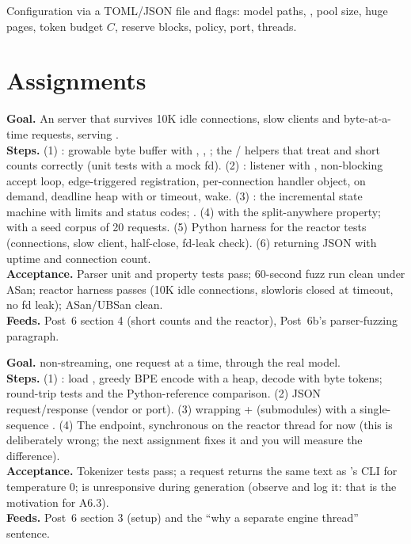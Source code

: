 Configuration via a TOML/JSON file and flags: model paths, , pool size, huge pages, token budget $C$, reserve blocks, policy, port, threads.

\section{Assignments}

\textbf{Goal.} An  server that survives 10K idle connections, slow clients and byte-at-a-time requests, serving .\\
\textbf{Steps.} (1) : growable byte buffer with , , ; the / helpers that treat  and short counts correctly (unit tests with a mock fd). (2) : listener with , non-blocking accept loop, edge-triggered registration, per-connection handler object,  on demand, deadline heap with  or  timeout,  wake. (3) : the incremental state machine with limits and status codes; . (4)  with the split-anywhere property;  with a seed corpus of 20 requests. (5) Python harness for the reactor tests (connections, slow client, half-close, fd-leak check). (6)  returning JSON with uptime and connection count.\\
\textbf{Acceptance.} Parser unit and property tests pass; 60-second fuzz run clean under ASan; reactor harness passes (10K idle connections, slowloris closed at timeout, no fd leak); ASan/UBSan clean.\\
\textbf{Feeds.} Post~6 section 4 (short counts and the reactor), Post~6b's parser-fuzzing paragraph.

\textbf{Goal.}  non-streaming, one request at a time, through the real model.\\
\textbf{Steps.} (1) : load , greedy BPE encode with a heap, decode with byte tokens; round-trip tests and the Python-reference comparison. (2) JSON request/response (vendor or port). (3)  wrapping  +  (submodules) with a single-sequence . (4) The endpoint, synchronous on the reactor thread for now (this is deliberately wrong; the next assignment fixes it and you will measure the difference).\\
\textbf{Acceptance.} Tokenizer tests pass; a  request returns the same text as 's CLI for temperature 0;  is unresponsive during generation (observe and log it: that is the motivation for A6.3).\\
\textbf{Feeds.} Post~6 section 3 (setup) and the ``why a separate engine thread'' sentence.

